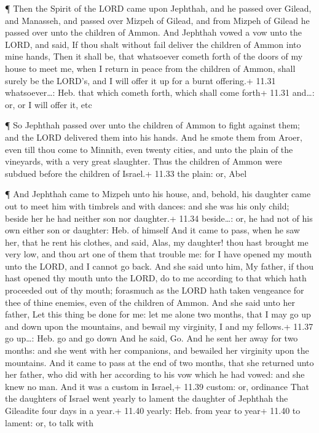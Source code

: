  ¶ Then the Spirit of the LORD came upon Jephthah, and he
passed over Gilead, and Manasseh, and passed over Mizpeh of Gilead, and
from Mizpeh of Gilead he passed over unto the children of Ammon.
 And Jephthah vowed a vow unto the LORD, and said, If thou
shalt without fail deliver the children of Ammon into mine hands,
 Then it shall be, that whatsoever cometh forth of the
doors of my house to meet me, when I return in peace from the children
of Ammon, shall surely be the LORD's, and I will offer it up for a burnt
offering.+ 11.31 whatsoever\ldots: Heb. that which cometh forth, which
shall come forth+ 11.31 and\ldots: or, or I will offer it, etc

 ¶ So Jephthah passed over unto the children of Ammon to
fight against them; and the LORD delivered them into his hands.
 And he smote them from Aroer, even till thou come to
Minnith, even twenty cities, and unto the plain of the vineyards, with a
very great slaughter. Thus the children of Ammon were subdued before the
children of Israel.+ 11.33 the plain: or, Abel

 ¶ And Jephthah came to Mizpeh unto his house, and, behold,
his daughter came out to meet him with timbrels and with dances: and she
was his only child; beside her he had neither son nor daughter.+ 11.34
beside\ldots: or, he had not of his own either son or daughter: Heb. of
himself  And it came to pass, when he saw her, that he rent
his clothes, and said, Alas, my daughter! thou hast brought me very low,
and thou art one of them that trouble me: for I have opened my mouth
unto the LORD, and I cannot go back.  And she said unto
him, My father, if thou hast opened thy mouth unto the LORD, do to me
according to that which hath proceeded out of thy mouth; forasmuch as
the LORD hath taken vengeance for thee of thine enemies, even of the
children of Ammon.  And she said unto her father, Let this
thing be done for me: let me alone two months, that I may go up and down
upon the mountains, and bewail my virginity, I and my fellows.+ 11.37 go
up\ldots: Heb. go and go down  And he said, Go. And he sent
her away for two months: and she went with her companions, and bewailed
her virginity upon the mountains.  And it came to pass at
the end of two months, that she returned unto her father, who did with
her according to his vow which he had vowed: and she knew no man. And it
was a custom in Israel,+ 11.39 custom: or, ordinance  That
the daughters of Israel went yearly to lament the daughter of Jephthah
the Gileadite four days in a year.+ 11.40 yearly: Heb. from year to
year+ 11.40 to lament: or, to talk with

